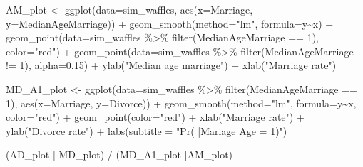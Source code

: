 \documentclass[
]{book}
\newenvironment{Shaded}{\begin{snugshade}}{\end{snugshade}}
\newcommand{\AttributeTok}[1]{\textcolor[rgb]{0.77,0.63,0.00}{#1}}
\newcommand{\DecValTok}[1]{\textcolor[rgb]{0.00,0.00,0.81}{#1}}
\newcommand{\FloatTok}[1]{\textcolor[rgb]{0.00,0.00,0.81}{#1}}
\newcommand{\FunctionTok}[1]{\textcolor[rgb]{0.00,0.00,0.00}{#1}}
\newcommand{\NormalTok}[1]{#1}
\newcommand{\OtherTok}[1]{\textcolor[rgb]{0.56,0.35,0.01}{#1}}
\newcommand{\SpecialCharTok}[1]{\textcolor[rgb]{0.00,0.00,0.00}{#1}}
\newcommand{\StringTok}[1]{\textcolor[rgb]{0.31,0.60,0.02}{#1}}
\begin{document}
\begin{Shaded}
\begin{Highlighting}[]
\NormalTok{AM\_plot }\OtherTok{\textless{}{-}}
  \FunctionTok{ggplot}\NormalTok{(}\AttributeTok{data=}\NormalTok{sim\_waffles, }\FunctionTok{aes}\NormalTok{(}\AttributeTok{x=}\NormalTok{Marriage, }\AttributeTok{y=}\NormalTok{MedianAgeMarriage)) }\SpecialCharTok{+} 
    \FunctionTok{geom\_smooth}\NormalTok{(}\AttributeTok{method=}\StringTok{"lm"}\NormalTok{, }\AttributeTok{formula=}\NormalTok{y}\SpecialCharTok{\textasciitilde{}}\NormalTok{x) }\SpecialCharTok{+} 
    \FunctionTok{geom\_point}\NormalTok{(}\AttributeTok{data=}\NormalTok{sim\_waffles }\SpecialCharTok{\%\textgreater{}\%} \FunctionTok{filter}\NormalTok{(MedianAgeMarriage }\SpecialCharTok{==} \DecValTok{1}\NormalTok{), }\AttributeTok{color=}\StringTok{"red"}\NormalTok{) }\SpecialCharTok{+}
    \FunctionTok{geom\_point}\NormalTok{(}\AttributeTok{data=}\NormalTok{sim\_waffles }\SpecialCharTok{\%\textgreater{}\%} \FunctionTok{filter}\NormalTok{(MedianAgeMarriage }\SpecialCharTok{!=} \DecValTok{1}\NormalTok{), }\AttributeTok{alpha=}\FloatTok{0.15}\NormalTok{) }\SpecialCharTok{+} 
    \FunctionTok{ylab}\NormalTok{(}\StringTok{"Median age marriage"}\NormalTok{) }\SpecialCharTok{+} 
    \FunctionTok{xlab}\NormalTok{(}\StringTok{"Marriage rate"}\NormalTok{) }

\NormalTok{MD\_A1\_plot }\OtherTok{\textless{}{-}} 
  \FunctionTok{ggplot}\NormalTok{(}\AttributeTok{data=}\NormalTok{sim\_waffles }\SpecialCharTok{\%\textgreater{}\%} \FunctionTok{filter}\NormalTok{(MedianAgeMarriage }\SpecialCharTok{==} \DecValTok{1}\NormalTok{), }
         \FunctionTok{aes}\NormalTok{(}\AttributeTok{x=}\NormalTok{Marriage, }\AttributeTok{y=}\NormalTok{Divorce)) }\SpecialCharTok{+} 
    \FunctionTok{geom\_smooth}\NormalTok{(}\AttributeTok{method=}\StringTok{"lm"}\NormalTok{, }\AttributeTok{formula=}\NormalTok{y}\SpecialCharTok{\textasciitilde{}}\NormalTok{x, }\AttributeTok{color=}\StringTok{"red"}\NormalTok{) }\SpecialCharTok{+} 
    \FunctionTok{geom\_point}\NormalTok{(}\AttributeTok{color=}\StringTok{"red"}\NormalTok{) }\SpecialCharTok{+}
    \FunctionTok{xlab}\NormalTok{(}\StringTok{"Marriage rate"}\NormalTok{) }\SpecialCharTok{+} 
    \FunctionTok{ylab}\NormalTok{(}\StringTok{"Divorce rate"}\NormalTok{) }\SpecialCharTok{+}
    \FunctionTok{labs}\NormalTok{(}\AttributeTok{subtitle =} \StringTok{"Pr( |Mariage Age = 1)"}\NormalTok{)}

\NormalTok{(AD\_plot }\SpecialCharTok{|}\NormalTok{ MD\_plot) }\SpecialCharTok{/}
\NormalTok{(MD\_A1\_plot }\SpecialCharTok{|}\NormalTok{AM\_plot)}
\end{Highlighting}
\end{Shaded}
\end{document}
